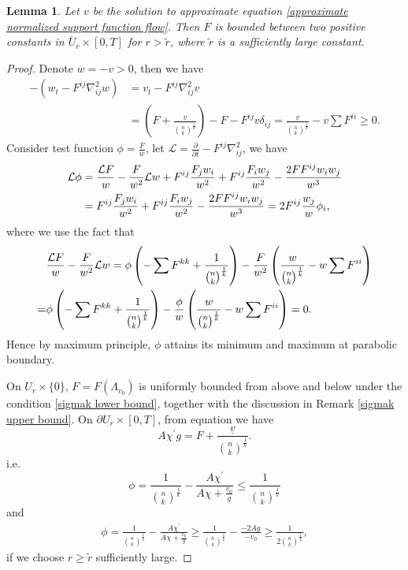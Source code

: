\documentclass[reqno]{amsart}
\newtheorem{lemma}[theorem]{Lemma}
\theoremstyle{remark}
\theoremstyle{definition}
\numberwithin{equation}{section}
\begin{document}
\begin{lemma}\label{Upper and lower bounds for F}
    Let $v$ be the solution to approximate equation \eqref{approximate normalized support function flow}. Then $F$ is bounded between two positive constants in $\overline{U}_r \times [0, T]$ for $r>\tilde{r}$, where $\tilde{r}$ is a sufficiently large constant.   
\end{lemma}
\begin{proof}
    Denote $w = -v >0$, then we have
    \begin{align*}
        -\left( w_t - F^{ij} \nabla^2_{ij} w \right) &= v_t - F^{ij} \nabla^2_{ij} v \\
        &= \left( F + \frac{v}{\binom{n}{k}^{\frac{1}{k}}} \right) - F - F^{ij} v \delta_{ij} = \frac{v}{\binom{n}{k}^{\frac{1}{k}}} - v \sum F^{ii} \geqslant 0.
    \end{align*}
    Consider test function $\phi = \frac{F}{w}$, let $\mathcal{L}=\frac{\partial}{\partial t} - F^{ij} \nabla^2_{ij}$, we have
    \begin{align}
        \mathcal{L}\phi &= \frac{\mathcal{L}F}{w} - \frac{F}{w^2} \mathcal{L}w + F^{ij}\frac{F_jw_i}{w^2} + F^{ij}\frac{F_iw_j}{w^2} - \frac{2F F^{ij} w_i w_j}{w^3} \notag \\
        &= F^{ij}\frac{F_jw_i}{w^2} + F^{ij}\frac{F_iw_j}{w^2} - \frac{2F F^{ij} w_i w_j}{w^3} = 2F^{ij}\frac{w_j}{w}\phi_i,
    \end{align}
    where we use the fact that
    \begin{align}
        &\frac{\mathcal{L}F}{w} - \frac{F}{w^2} \mathcal{L}w 
        = \phi \left( - \sum F^{kk} + \frac{1}{\binom{n}{k}^{\frac{1}{k}}} \right) - \frac{F}{w^2} \left( \frac{w}{\binom{n}{k}^{\frac{1}{k}}} - w \sum F^{ii} \right) \notag \\
        =& \phi \left( - \sum F^{kk} + \frac{1}{\binom{n}{k}^{\frac{1}{k}}} \right) - \frac{\phi}{w} \left( \frac{w}{\binom{n}{k}^{\frac{1}{k}}} - w \sum F^{ii} \right) = 0.
    \end{align}
    Hence by maximum principle, $\phi$ attains its minimum and maximum at parabolic boundary. 
    
    On $U_r \times \{0\}$, $F = F(\Lambda_{v_0})$ is uniformly bounded from above and below under the condition \eqref{sigmak lower bound}, together with the discussion in Remark \ref{sigmak upper bound}. 
    On $\partial U_r \times [0, T]$, from equation we have
    \[
    A \chi^{\prime} g = F + \frac{\underline{v}}{\binom{n}{k}^{\frac{1}{k}}}.
    \]
    i.e.
    \[
    \phi = \frac{1}{\binom{n}{k}^{\frac{1}{k}}} - \frac{A \chi^{\prime}}{A \chi + \frac{v_0}{g}} \leqslant \frac{1}{\binom{n}{k}^{\frac{1}{k}}}
    \]
    and 
    \begin{align*}
        \phi = \frac{1}{\binom{n}{k}^{\frac{1}{k}}} - \frac{A \chi^{\prime}}{A \chi + \frac{v_0}{g}} 
        \geqslant \frac{1}{\binom{n}{k}^{\frac{1}{k}}} - \frac{-2Ag}{-v_0}
        \geqslant \frac{1}{2\binom{n}{k}^{\frac{1}{k}}},
    \end{align*}
    if we choose $r \geqslant \tilde{r}$ sufficiently large. 
\end{proof}
\end{document}
